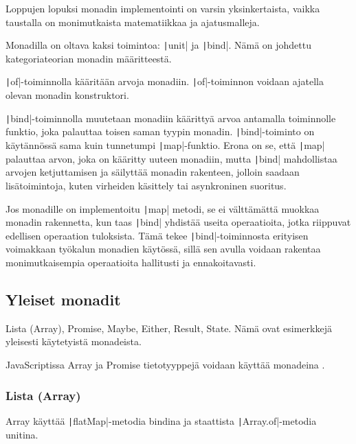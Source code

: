 Loppujen lopuksi monadin implementointi on varsin yksinkertaista, vaikka taustalla on monimutkaista matematiikkaa ja ajatusmalleja.

Monadilla on oltava kaksi toimintoa: \texttt|unit| ja \texttt|bind|. Nämä on johdettu kategoriateorian monadin määritteestä. \citep{bartosz_category_for_progamers_10}

\texttt|of|-toiminnolla kääritään arvoja monadiin. \texttt|of|-toiminnon voidaan ajatella olevan monadin konstruktori.

\texttt|bind|-toiminnolla muutetaan monadiin käärittyä arvoa antamalla toiminnolle funktio, joka palauttaa toisen saman tyypin monadin. \texttt|bind|-toiminto on käytännössä sama kuin tunnetumpi \texttt|map|-funktio. Erona on se, että \texttt|map| palauttaa arvon, joka on kääritty uuteen monadiin, mutta \texttt|bind| mahdollistaa arvojen ketjuttamisen ja säilyttää monadin rakenteen, jolloin saadaan lisätoimintoja, kuten virheiden käsittely tai asynkroninen suoritus.

Jos monadille on implementoitu \texttt|map| metodi, se ei välttämättä muokkaa monadin rakennetta, kun taas \texttt|bind| yhdistää useita operaatioita, jotka riippuvat edellisen operaation tuloksista. Tämä tekee \texttt|bind|-toiminnosta erityisen voimakkaan työkalun monadien käytössä, sillä sen avulla voidaan rakentaa monimutkaisempia operaatioita hallitusti ja ennakoitavasti.



\subsection{Yleiset monadit}

Lista (Array), Promise, Maybe, Either, Result, State. Nämä ovat esimerkkejä yleisesti käytetyistä monadeista. \cite{monad_wikipedia,bartosz_category_for_progamers_10}

JavaScriptissa Array ja Promise tietotyyppejä voidaan käyttää monadeina \cite{stackoverflow_flatmap_monad,stackoverflow:why_monad,promises-spec-94}.


\subsubsection{Lista (Array)}

Array käyttää \texttt|flatMap|-metodia bindina ja staattista \texttt|Array.of|-metodia unitina.

